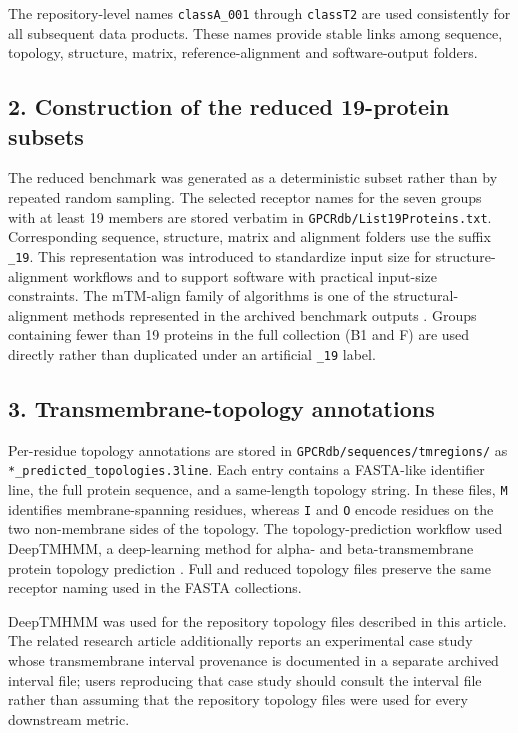 \documentclass[a4paper,12pt]{article}
\begin{document}
	The repository-level names \texttt{classA\_001} through \texttt{classT2} are used consistently for all subsequent data products. These names provide stable links among sequence, topology, structure, matrix, reference-alignment and software-output folders.
	
	\subsection*{2. Construction of the reduced 19-protein subsets}
	The reduced benchmark was generated as a deterministic subset rather than by repeated random sampling. The selected receptor names for the seven groups with at least 19 members are stored verbatim in \texttt{GPCRdb/List19Proteins.txt}. Corresponding sequence, structure, matrix and alignment folders use the suffix \texttt{\_19}. This representation was introduced to standardize input size for structure-alignment workflows and to support software with practical input-size constraints. The mTM-align family of algorithms is one of the structural-alignment methods represented in the archived benchmark outputs \cite{dong2018mtmalign}. Groups containing fewer than 19 proteins in the full collection (B1 and F) are used directly rather than duplicated under an artificial \texttt{\_19} label.
	
	\subsection*{3. Transmembrane-topology annotations}
	Per-residue topology annotations are stored in \texttt{GPCRdb/sequences/tmregions/} as \texttt{*\_predicted\_topologies.3line}. Each entry contains a FASTA-like identifier line, the full protein sequence, and a same-length topology string. In these files, \texttt{M} identifies membrane-spanning residues, whereas \texttt{I} and \texttt{O} encode residues on the two non-membrane sides of the topology. The topology-prediction workflow used DeepTMHMM, a deep-learning method for alpha- and beta-transmembrane protein topology prediction \cite{hallgren2022deeptmhmm}. Full and reduced topology files preserve the same receptor naming used in the FASTA collections.
	
	DeepTMHMM was used for the repository topology files described in this article. The related research article additionally reports an experimental case study whose transmembrane interval provenance is documented in a separate archived interval file; users reproducing that case study should consult the interval file rather than assuming that the repository topology files were used for every downstream metric.
	
\end{document}
